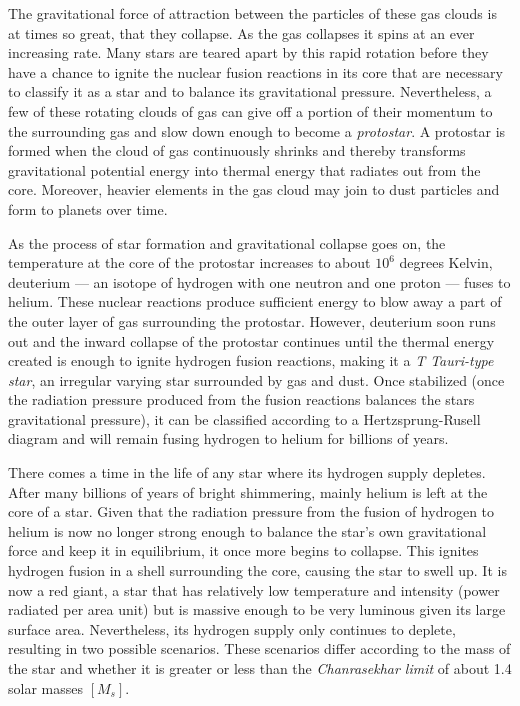 The gravitational force of attraction between the particles of these gas clouds is at times so great, that they collapse. As the gas collapses it spins at an ever increasing rate. Many stars are teared apart by this rapid rotation before they have a chance to ignite the nuclear fusion reactions in its core that are necessary to classify it as a star and to balance its gravitational pressure. Nevertheless, a few of these rotating clouds of gas can give off a portion of their momentum to the surrounding gas and slow down enough to become a \emph{protostar}. A protostar is formed when the cloud of gas continuously shrinks and thereby transforms gravitational potential energy into thermal energy that radiates out from the core. Moreover, heavier elements in the gas cloud may join to dust particles and form to planets over time.


As the process of star formation and gravitational collapse goes on, the temperature at the core of the protostar increases to about $10^6$ degrees Kelvin, deuterium --- an isotope of hydrogen with one neutron and one proton --- fuses to helium. These nuclear reactions produce sufficient energy to blow away a part of the outer layer of gas surrounding the protostar. However, deuterium soon runs out and the inward collapse of the protostar continues until the thermal energy created is enough to ignite hydrogen fusion reactions, making it a \emph{T Tauri-type star}, an irregular varying star surrounded by gas and dust. Once stabilized (once the radiation pressure produced from the fusion reactions balances the stars gravitational pressure), it can be classified according to a Hertzsprung-Rusell diagram and will remain fusing hydrogen to helium for billions of years.


There comes a time in the life of any star where its hydrogen supply depletes. After many billions of years of bright shimmering, mainly helium is left at the core of a star. Given that the radiation pressure from the fusion of hydrogen to helium is now no longer strong enough to balance the star's own gravitational force and keep it in equilibrium, it once more begins to collapse. This ignites hydrogen fusion in a shell surrounding the core, causing the star to swell up. It is now a red giant, a star that has relatively low temperature and intensity (power radiated per area unit) but is massive enough to be very luminous given its large surface area. Nevertheless, its hydrogen supply only continues to deplete, resulting in two possible scenarios. These scenarios differ according to the mass of the star and whether it is greater or less than the \emph{Chanrasekhar limit} of about 1.4 solar masses $[M_s]$.

